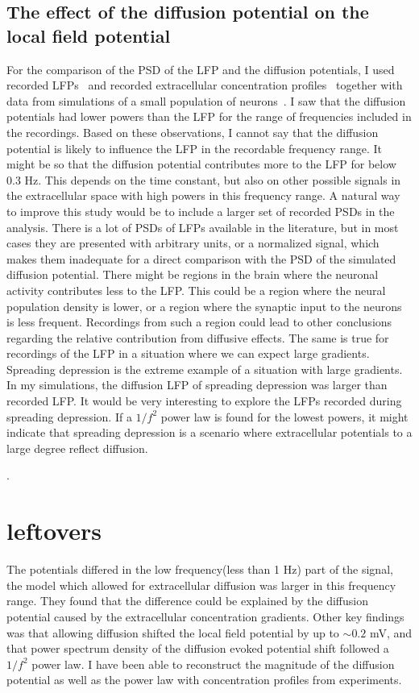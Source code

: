 \documentclass{uiophd}
\begin{document}
\section{The effect of the diffusion potential on the local field potential}
For the comparison of the PSD of the LFP and the diffusion potentials, I used recorded LFPs~\cite{Gratiy2017}\cite{Baranauskas2011}\cite{Telenczuk} and recorded extracellular concentration profiles~\cite{Dietzel1982}\cite{Nicholson1987}\cite{CordingleySomjen}  together with data from simulations of a small population of neurons~\cite{Halnes2016}. I saw that the diffusion potentials had lower powers than the LFP for the range of  frequencies included in the recordings.  Based on these observations, I cannot say that the diffusion potential is likely to influence the LFP in the recordable frequency range. It might be so that the diffusion potential contributes more to the LFP for below 0.3 Hz. This depends on the time constant, but also on other possible signals in the extracellular space with high powers in this frequency range.
A natural way to improve this study would be to include a larger set of recorded PSDs in the analysis. There is a lot of PSDs of LFPs available in the literature, but in most cases they are presented with arbitrary units, or a normalized signal, which makes them inadequate for a direct comparison with the PSD of the simulated diffusion potential. There might be regions in the brain where the neuronal activity contributes less to the LFP. This could be a region where the neural population density is lower, or a region where the synaptic input to the neurons is less frequent. Recordings from such a region could lead to other conclusions regarding the relative contribution from diffusive effects. 
The same is true for recordings of the LFP in a situation where we can expect large gradients. Spreading depression is the extreme  example of a situation with large gradients. In my simulations, the diffusion LFP of spreading depression was larger than recorded LFP. It would be very interesting to explore the LFPs recorded during spreading depression. If a $1/f^2$ power law is found for the lowest powers, it might indicate that spreading depression is a scenario where extracellular potentials to a large degree reflect diffusion.

. 
\chapter{leftovers}


The potentials differed in the low frequency(less than 1 Hz) part of the signal, the model which allowed for extracellular diffusion was larger in this frequency range. They found that the difference could be explained by the diffusion potential caused by the extracellular concentration gradients. Other key findings was that allowing diffusion shifted the local field potential by up to $\sim 0.2$ mV, and that power spectrum density of the diffusion evoked potential shift followed a $1/f^2$ power law. I have been able to reconstruct the magnitude of the diffusion potential as well as the power law with concentration profiles from experiments. 
\end{document}
